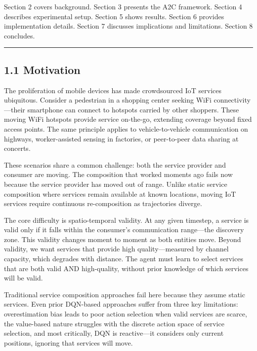 \documentclass[
  10pt,
  twocolumn,
]{article}
\begin{document}
Section 2 covers background. Section 3 presents the A2C framework.
Section 4 describes experimental setup. Section 5 shows results. Section
6 provides implementation details. Section 7 discusses implications and
limitations. Section 8 concludes.

\begin{center}\rule{0.5\linewidth}{0.5pt}\end{center}

\hypertarget{motivation}{%
	\subsection{1.1 Motivation}\label{motivation}}

The proliferation of mobile devices has made crowdsourced IoT services
ubiquitous. Consider a pedestrian in a shopping center seeking WiFi
connectivity---their smartphone can connect to hotspots carried by other
shoppers. These moving WiFi hotspots provide service on-the-go,
extending coverage beyond fixed access points. The same principle
applies to vehicle-to-vehicle communication on highways, worker-assisted
sensing in factories, or peer-to-peer data sharing at concerts.

These scenarios share a common challenge: both the service provider and
consumer are moving. The composition that worked moments ago fails now
because the service provider has moved out of range. Unlike static
service composition where services remain available at known locations,
moving IoT services require continuous re-composition as trajectories
diverge.

The core difficulty is spatio-temporal validity. At any given timestep,
a service is valid only if it falls within the consumer's communication
range---the discovery zone. This validity changes moment to moment as
both entities move. Beyond validity, we want services that provide high
quality---measured by channel capacity, which degrades with distance.
The agent must learn to select services that are both valid AND
high-quality, without prior knowledge of which services will be valid.

Traditional service composition approaches fail here because they assume
static services. Even prior DQN-based approaches suffer from three key
limitations: overestimation bias leads to poor action selection when
valid services are scarce, the value-based nature struggles with the
discrete action space of service selection, and most critically, DQN is
reactive---it considers only current positions, ignoring that services
will move.
\end{document}
